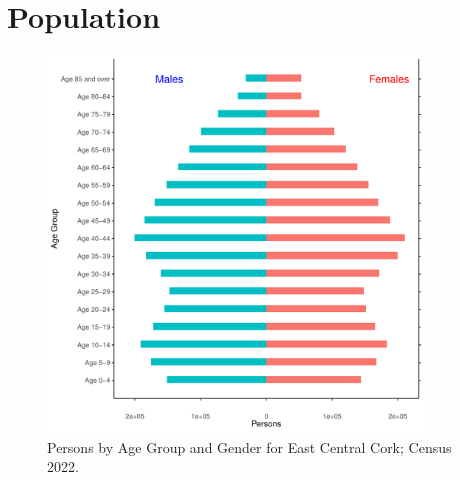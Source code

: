 \documentclass{article}
\begin{document}
\pagebreak

\section{Population} 
\label{sect:Pop}

\begin{figure}[h]
	\centering
	\includegraphics[width = 100mm]{../figures/PyramidPlot.pdf}
	\caption{Persons by Age Group and Gender for East Central Cork; Census 2022.}
	\label{fig:2ae19629-1a6a-13a3-e055-000000000001}
	\end{figure}
\end{document}
